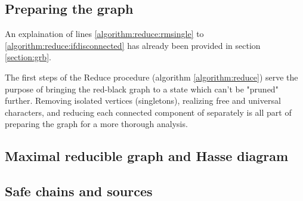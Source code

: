 \subsection{Preparing the graph}\label{section:preparing-the-graph}

An explaination of lines \ref{algorithm:reduce:rmsingle} to \ref{algorithm:reduce:ifdisconnected} has already been provided in section \ref{section:grb}.

The first steps of the Reduce procedure (algorithm \ref{algorithm:reduce}) serve the purpose of bringing the red-black graph to a state which can't be "pruned" further.
Removing isolated vertices (singletons), realizing free and universal characters, and reducing each connected component of \grb{} separately is all part of preparing the graph for a more thorough analysis.

\subsection{Maximal reducible graph and Hasse diagram}\label{section:gm-hassediagram}

\subsection{Safe chains and sources}\label{section:safe-chains-sources}
